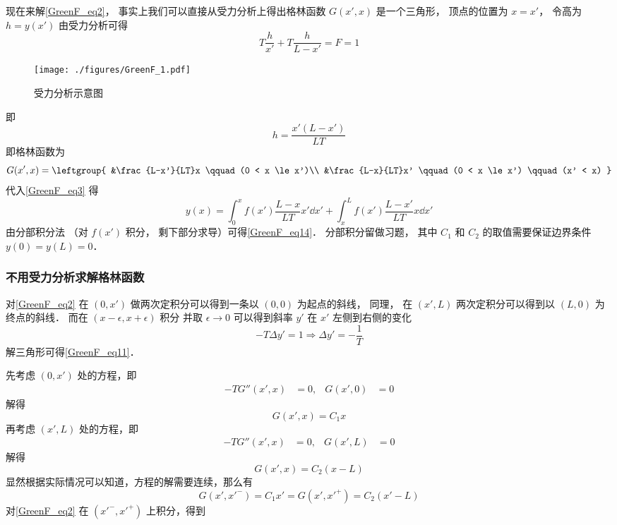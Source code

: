 现在来解\autoref{GreenF_eq2}， 事实上我们可以直接从受力分析上得出格林函数 $G(x', x)$ 是一个三角形， 顶点的位置为 $x = x'$， 令高为 $h = y(x')$ 由受力分析可得
\begin{equation}
T\frac{h}{x'} + T\frac{h}{L - x'} = F = 1
\end{equation}
\begin{figure}[ht]
\centering
\texttt{[image: ./figures/GreenF\_1.pdf]}
\caption{受力分析示意图} \label{GreenF_fig1}
\end{figure}
即
\begin{equation}\label{GreenF_eq11}
h = \frac{x' (L - x')}{LT}
\end{equation}
即格林函数为
\begin{equation}
G(x', x) = \leftgroup{
&\frac{L-x'}{LT}x \qquad (0 < x \le x')\\
&\frac{L-x}{LT}x' \qquad (0 < x \le x') \qquad (x' < x)
}\end{equation}
代入\autoref{GreenF_eq3} 得
\begin{equation}\label{GreenF_eq12}
y(x) = \int_0^x f(x') \frac{L-x}{LT}x'\dd{x'} + \int_x^L f(x')\frac{L-x'}{LT}x \dd{x'}
\end{equation}
由分部积分法 （对 $f(x')$ 积分， 剩下部分求导）可得\autoref{GreenF_eq14}． 分部积分留做习题， 其中 $C_1$ 和 $C_2$ 的取值需要保证边界条件 $y(0) = y(L) = 0$．

\subsubsection{不用受力分析求解格林函数}
对\autoref{GreenF_eq2} 在 $(0, x')$ 做两次定积分可以得到一条以 $(0,0)$ 为起点的斜线， 同理， 在 $(x', L)$ 两次定积分可以得到以 $(L, 0)$ 为终点的斜线． 而在 $(x-\epsilon, x+\epsilon)$ 积分 并取 $\epsilon\to 0$ 可以得到斜率 $y'$ 在 $x'$ 左侧到右侧的变化
\begin{equation}
-T\Delta y' = 1 \Longrightarrow \Delta y' = -\frac{1}{T}
\end{equation}
解三角形可得\autoref{GreenF_eq11}．

先考虑 $(0,x')$ 处的方程，即
\begin{align}
-TG''(x',x) &=0,&
G(x',0)&=0
\end{align}
解得
\begin{equation}
G(x',x)=C_1 x
\end{equation}
再考虑 $(x',L)$ 处的方程，即
\begin{align}
-TG''(x',x) &= 0,&
G(x',L) &= 0
\end{align}
解得
\begin{equation}
G(x',x) = C_2 (x-L)
\end{equation}
显然根据实际情况可以知道，方程的解需要连续，那么有
\begin{equation}
G(x',x'^-) = C_1x' = G(x',x'^+) = C_2 (x'-L)
\end{equation}
对\autoref{GreenF_eq2} 在 $(x'^-,x'^+)$ 上积分，得到



